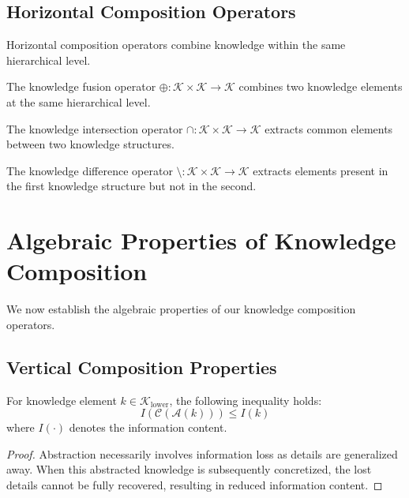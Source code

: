\subsection{Horizontal Composition Operators}

Horizontal composition operators combine knowledge within the same hierarchical level.

\begin{definition}
The knowledge fusion operator $\oplus: \mathcal{K} \times \mathcal{K} \rightarrow \mathcal{K}$ combines two knowledge elements at the same hierarchical level.
\end{definition}

\begin{definition}
The knowledge intersection operator $\cap: \mathcal{K} \times \mathcal{K} \rightarrow \mathcal{K}$ extracts common elements between two knowledge structures.
\end{definition}

\begin{definition}
The knowledge difference operator $\setminus: \mathcal{K} \times \mathcal{K} \rightarrow \mathcal{K}$ extracts elements present in the first knowledge structure but not in the second.
\end{definition}

\section{Algebraic Properties of Knowledge Composition}

We now establish the algebraic properties of our knowledge composition operators.

\subsection{Vertical Composition Properties}

\begin{theorem}
For knowledge element $k \in \mathcal{K}_{\text{lower}}$, the following inequality holds:
\begin{equation}
I(\mathcal{C}(\mathcal{A}(k))) \leq I(k)
\end{equation}
where $I(\cdot)$ denotes the information content.
\end{theorem}

\begin{proof}
Abstraction necessarily involves information loss as details are generalized away. When this abstracted knowledge is subsequently concretized, the lost details cannot be fully recovered, resulting in reduced information content.
\end{proof}

